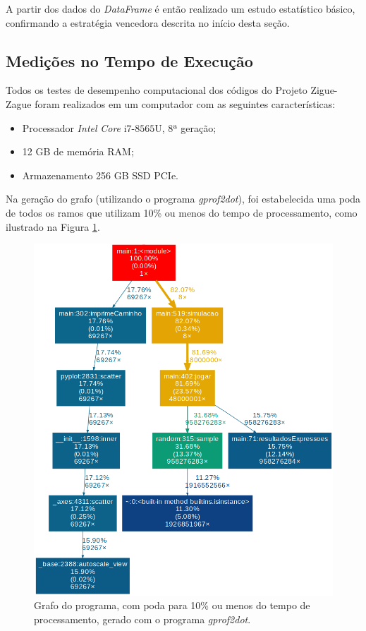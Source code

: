 \documentclass[12pt]{article}
\begin{document}
A partir dos dados do \textit{DataFrame} é então realizado um estudo estatístico básico, confirmando a estratégia vencedora descrita no início desta seção.


\subsection{Medições no Tempo de Execução}
\label{medicoes}

Todos os testes de desempenho computacional dos códigos do Projeto Zigue-Zague foram realizados em um computador com as seguintes características:

\begin{itemize}
	\item Processador \textit{Intel}\textregistered \hspace{0.05cm} \textit{Core}\texttrademark \hspace{0.05cm} i$7$-$8565$U, 8ª geração;
	\item 12 GB de memória RAM;
	\item Armazenamento 256 GB SSD PCIe.
\end{itemize}

Na geração do grafo (utilizando o programa \textit{gprof2dot}), foi estabelecida uma poda de todos os ramos que utilizam 10\% ou menos do tempo de processamento, como ilustrado na Figura \ref{grafo:10}.

\begin{figure}[ht!]
	\centering
	\includegraphics[width=0.85\linewidth]{img/grafo.png}
	\caption{Grafo do programa, com poda para 10\% ou menos do tempo de processamento, gerado com o programa \textit{gprof2dot}.}
	\label{grafo:10}
\end{figure}
\end{document}
